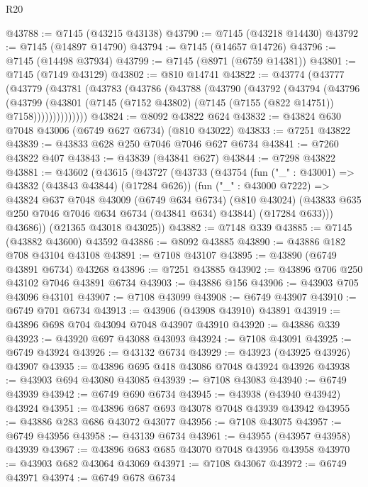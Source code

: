 \begin{lexlean}{R20}
\begin{coremodule}
{@43788 := @7145 (@43215 @43138)
@43790 := @7145 (@43218 @14430)
@43792 := @7145 (@14897 @14790)
@43794 := @7145 (@14657 @14726)
@43796 := @7145 (@14498 @37934)
@43799 := @7145 (@8971 (@6759 @14381))
@43801 := @7145 (@7149 @43129)
@43802 := @810 @14741
@43822 := @43774
    (@43777
      (@43779
        (@43781
          (@43783
            (@43786
              (@43788
                (@43790
                  (@43792
                    (@43794
                      (@43796
                        (@43799
                          (@43801
                            (@7145 (@7152 @43802) (@7145 (@7155 (@822 @14751)) @7158))))))))))))))
@43824 := @8092 @43822 @624
@43832 := @43824 @630 @7048 @43006 (@6749 @627 @6734) (@810 @43022)
@43833 := @7251 @43822
@43839 := @43833 @628 @250 @7046 @7046 @627 @6734
@43841 := @7260 @43822 @407
@43843 := @43839 (@43841 @627)
@43844 := @7298 @43822
@43881 := @43602
    (@43615
      (@43727
        (@43733
          (@43754
            (fun ("_" : @43001) => @43832 (@43843 @43844) (@17284 @626))
            (fun ("_" : @43000 @7222) =>
            @43824
              @637
              @7048
              @43009
              (@6749 @634 @6734)
              (@810 @43024)
              (@43833 @635 @250 @7046 @7046 @634 @6734 (@43841 @634) @43844)
              (@17284 @633)))
          @43686))
      (@21365 @43018 @43025))
@43882 := @7148 @339
@43885 := @7145 (@43882 @43600) @43592
@43886 := @8092 @43885
@43890 := @43886 @182 @708 @43104 @43108
@43891 := @7108 @43107
@43895 := @43890 (@6749 @43891 @6734) @43268
@43896 := @7251 @43885
@43902 := @43896 @706 @250 @43102 @7046 @43891 @6734
@43903 := @43886 @156
@43906 := @43903 @705 @43096 @43101
@43907 := @7108 @43099
@43908 := @6749 @43907
@43910 := @6749 @701 @6734
@43913 := @43906 (@43908 @43910) @43891
@43919 := @43896 @698 @704 @43094 @7048 @43907 @43910
@43920 := @43886 @339
@43923 := @43920 @697 @43088 @43093
@43924 := @7108 @43091
@43925 := @6749 @43924
@43926 := @43132 @6734
@43929 := @43923 (@43925 @43926) @43907
@43935 := @43896 @695 @418 @43086 @7048 @43924 @43926
@43938 := @43903 @694 @43080 @43085
@43939 := @7108 @43083
@43940 := @6749 @43939
@43942 := @6749 @690 @6734
@43945 := @43938 (@43940 @43942) @43924
@43951 := @43896 @687 @693 @43078 @7048 @43939 @43942
@43955 := @43886 @283 @686 @43072 @43077
@43956 := @7108 @43075
@43957 := @6749 @43956
@43958 := @43139 @6734
@43961 := @43955 (@43957 @43958) @43939
@43967 := @43896 @683 @685 @43070 @7048 @43956 @43958
@43970 := @43903 @682 @43064 @43069
@43971 := @7108 @43067
@43972 := @6749 @43971
@43974 := @6749 @678 @6734
}
\end{coremodule}
\end{lexlean}
